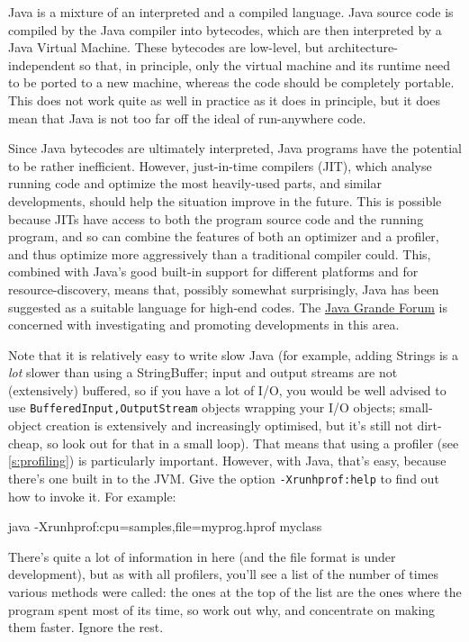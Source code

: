 \documentclass[11pt,oneside,chapters]{starlink}
\begin{document}
Java is a mixture of an interpreted and a compiled
language.  Java source code is compiled by the Java
compiler into bytecodes, which are then interpreted by a
Java Virtual Machine.  These bytecodes are low-level, but
architecture-independent so that, in principle, only the
virtual machine and its runtime need to be ported to a new
machine, whereas the code should be completely portable.
This does not work quite as well in practice as it does in
principle, but it does mean that Java is not too far off
the ideal of run-anywhere code.

Since Java bytecodes are ultimately interpreted, Java
programs have the potential to be rather inefficient.
However, just-in-time compilers (JIT), which analyse
running code and optimize the most heavily-used parts, and
similar developments, should help the situation improve in
the future.  This is possible because JITs have access to
both the program source code and the running program, and
so can combine the features of both an optimizer and a
profiler, and thus optimize more aggressively than a
traditional compiler could.  This, combined with Java's
good built-in support for different platforms and for
resource-discovery, means that, possibly somewhat
surprisingly, Java has been suggested as a suitable
language for high-end codes.  The
\href{http://www.javagrande.org/}{Java Grande Forum}
is concerned with investigating and
promoting developments in this area.

Note that it is relatively easy to write slow Java (for
example, adding Strings is a \emph{lot} slower than
using a StringBuffer; input and output streams are not
(extensively) buffered, so if you have a lot of I/O, you
would be well advised to use
\texttt{Buffered{Input,Output}Stream} objects wrapping
your I/O objects; small-object creation is extensively and
increasingly optimised, but it's still not dirt-cheap, so
look out for that in a small loop).  That means that using
a profiler (see \ref{s:profiling}) is particularly
important.  However, with Java, that's easy, because
there's one built in to the JVM.  Give the option
\texttt{-Xrunhprof:help} to find out how to invoke it.
For example: 

\begin{terminalv}
java -Xrunhprof:cpu=samples,file=myprog.hprof myclass
\end{terminalv}

There's quite a lot of information in
here (and the file format is under development), but as
with all profilers, you'll see a list of the number of
times various methods were called: the ones at the top of
the list are the ones where the program spent most of its
time, so work out why, and concentrate on making them
faster.  Ignore the rest.
\end{document}
